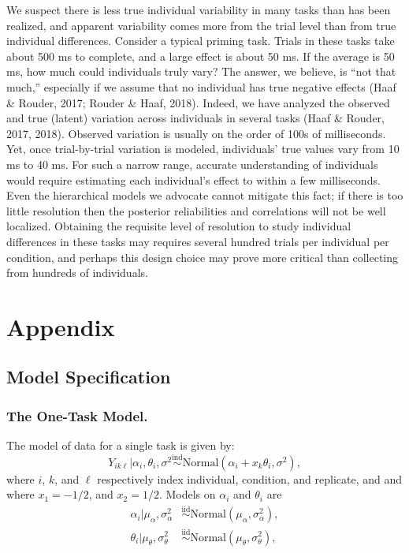 \documentclass[english,man]{apa6}
\theoremstyle{definition}
\theoremstyle{definition}
\theoremstyle{definition}
\theoremstyle{remark}
\begin{document}
We suspect there is less true individual variability in many tasks than
has been realized, and apparent variability comes more from the trial
level than from true individual differences. Consider a typical priming
task. Trials in these tasks take about 500 ms to complete, and a large
effect is about 50 ms. If the average is 50 ms, how much could
individuals truly vary? The answer, we believe, is \enquote{not that
much,} especially if we assume that no individual has true negative
effects (Haaf \& Rouder, 2017; Rouder \& Haaf, 2018). Indeed, we have
analyzed the observed and true (latent) variation across individuals in
several tasks (Haaf \& Rouder, 2017, 2018). Observed variation is
usually on the order of 100s of milliseconds. Yet, once trial-by-trial
variation is modeled, individuals' true values vary from 10 ms to 40 ms.
For such a narrow range, accurate understanding of individuals would
require estimating each individual's effect to within a few
milliseconds. Even the hierarchical models we advocate cannot mitigate
this fact; if there is too little resolution then the posterior
reliabilities and correlations will not be well localized. Obtaining the
requisite level of resolution to study individual differences in these
tasks may requires several hundred trials per individual per condition,
and perhaps this design choice may prove more critical than collecting
from hundreds of individuals.

\newpage

\section{Appendix}\label{appendix}

\subsection{Model Specification}\label{model-specification-1}

\subsubsection{The One-Task Model.}\label{the-one-task-model.}

The model of data for a single task is given by: \[
Y_{ik\ell}|\alpha_i,\theta_i,\sigma^2 \stackrel{\mbox{ind}}{\sim }\mbox{Normal}(\alpha_{i}+x_k\theta_{i},\sigma^2),
\] where \(i\), \(k\), and \(\ell\) respectively index individual,
condition, and replicate, and and where \(x_1=-1/2\), and \(x_2=1/2\).
Models on \(\alpha_i\) and \(\theta_i\) are \[
\begin{aligned}
\alpha_i|\mu_\alpha,\sigma^2_\alpha &\stackrel{\mbox{iid}}{\sim} \mbox{Normal}(\mu_\alpha,\sigma^2_\alpha),\\
\theta_i|\mu_\theta,\sigma^2_\theta &\stackrel{\mbox{iid}}{\sim} \mbox{Normal}(\mu_\theta,\sigma^2_\theta),
\end{aligned}
\]
\end{document}
